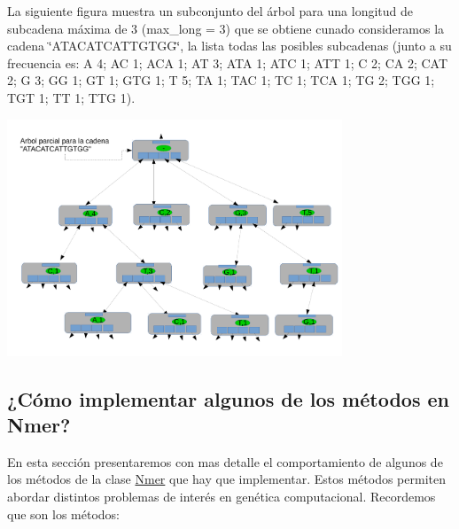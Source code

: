 La siguiente figura muestra un subconjunto del árbol para una longitud de subcadena máxima de 3 (max\+\_\+long = 3) que se obtiene cunado consideramos la cadena \char`\"{}\+A\+T\+A\+C\+A\+T\+C\+A\+T\+T\+G\+T\+G\+G\char`\"{}, la lista todas las posibles subcadenas (junto a su frecuencia es\+: A 4; AC 1; A\+CA 1; AT 3; A\+TA 1; A\+TC 1; A\+TT 1; C 2; CA 2; C\+AT 2; G 3; GG 1; GT 1; G\+TG 1; T 5; TA 1; T\+AC 1; TC 1; T\+CA 1; TG 2; T\+GG 1; T\+GT 1; TT 1; T\+TG 1).

 
\begin{DoxyImage}
\includegraphics[width=10cm]{ktree_cadena}
\caption{Cadena de A\+DN $<$A\+T\+A\+C\+A\+T\+C\+A\+T\+T\+G\+T\+GG$>$ representada como un ktree}
\end{DoxyImage}
\hypertarget{index_otrosMetodos}{}\subsection{¿\+Cómo implementar algunos de los métodos en Nmer?}\label{index_otrosMetodos}
En esta sección presentaremos con mas detalle el comportamiento de algunos de los métodos de la clase \hyperlink{classNmer}{Nmer} que hay que implementar. Estos métodos permiten abordar distintos problemas de interés en genética computacional. Recordemos que son los métodos\+:


